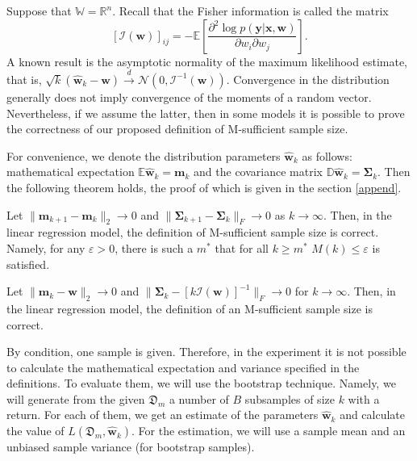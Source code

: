 \documentclass[
11pt,%
tightenlines,%
twoside,%
onecolumn,%
nofloats,%
nobibnotes,%
nofootinbib,%
superscriptaddress,%
noshowpacs,%
centertags]%
{revtex4-2}
\begin{document}
Suppose that $\mathbb{W} = \mathbb{R}^n$. Recall that the Fisher information is called the matrix
\[ \left[\mathcal{I}(\mathbf{w})\right]_{ij} = - \mathbb{E}\left[ \dfrac{\partial^2 \log p(\mathbf{y} | \mathbf{x}, \mathbf{w})}{\partial w_i \partial w_j} \right]. \]
A known result is the asymptotic normality of the maximum likelihood estimate, that is, $\sqrt{k}\left(\hat{\mathbf{w}}_k -\mathbf{w}\right)\xrightarrow{d}\mathcal{N}\left(0, \mathcal{I}^{-1}(\mathbf{w})\right)$. Convergence in the distribution generally does not imply convergence of the moments of a random vector. Nevertheless, if we assume the latter, then in some models it is possible to prove the correctness of our proposed definition of M-sufficient sample size.

For convenience, we denote the distribution parameters $\hat{\mathbf{w}}_k$ as follows: mathematical expectation $\mathbb{E}\hat{\mathbf{w}}_k=\mathbf{m}_k$ and the covariance matrix $\mathbb{D} \hat{\mathbf{w}}_k = \mathbf{\Sigma}_k$. Then the following theorem holds, the proof of which is given in the section \ref{append}.

\begin{theorem}\label{theorem1}
    Let $\|\mathbf{m}_{k+1} - \mathbf{m}_k\|_2 \to 0$ and $\|\mathbf{\Sigma}_{k+1} - \mathbf{\Sigma}_k\|_{F}\to 0$ as $k\to \infty$. Then, in the linear regression model, the definition of M-sufficient sample size is correct. Namely, for any $\varepsilon > 0$, there is such a $m^*$ that for all $k\geqslant m^*$ $M(k)\leqslant\varepsilon$ is satisfied.
\end{theorem}

\begin{corollary}
    Let $\|\mathbf{m}_k - \mathbf{w}\|_2\to 0$ and $\|\mathbf{\Sigma}_k - \left[k\mathcal{I}(\mathbf{w})\right]^{-1}\|_{F}\to 0$ for $k \to \infty$. Then, in the linear regression model, the definition of an M-sufficient sample size is correct. 
\end{corollary}

By condition, one sample is given. Therefore, in the experiment it is not possible to calculate the mathematical expectation and variance specified in the definitions. To evaluate them, we will use the bootstrap technique. Namely, we will generate from the given $\mathfrak{D}_m$ a number of $B$ subsamples of size $k$ with a return. For each of them, we get an estimate of the parameters $\hat{\mathbf{w}}_{k}$ and calculate the value of $L(\mathfrak{D}_m, \hat{\mathbf{w}}_{k})$. For the estimation, we will use a sample mean and an unbiased sample variance (for bootstrap samples).
\end{document}
